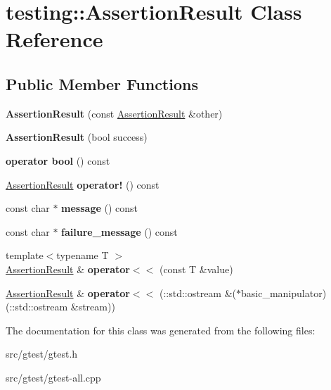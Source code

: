 \hypertarget{classtesting_1_1_assertion_result}{}\section{testing\+:\+:Assertion\+Result Class Reference}
\label{classtesting_1_1_assertion_result}
\subsection*{Public Member Functions}
\begin{DoxyCompactItemize}
\item 
\mbox{\label{classtesting_1_1_assertion_result_a27788116f03f90aec4daf592fd809ead}} 
{\bfseries Assertion\+Result} (const \mbox{\hyperlink{classtesting_1_1_assertion_result}{Assertion\+Result}} \&other)
\item 
\mbox{\label{classtesting_1_1_assertion_result_ade695178c05c4b2f82e92930c912fc25}} 
{\bfseries Assertion\+Result} (bool success)
\item 
\mbox{\label{classtesting_1_1_assertion_result_ab3f34b1623c82762ef4a8f52b535159c}} 
{\bfseries operator bool} () const
\item 
\mbox{\label{classtesting_1_1_assertion_result_a5b0784686a756660ac8dfe528d89386b}} 
\mbox{\hyperlink{classtesting_1_1_assertion_result}{Assertion\+Result}} {\bfseries operator!} () const
\item 
\mbox{\label{classtesting_1_1_assertion_result_a33c14dafd28e3393c841e03f4b70a017}} 
const char $\ast$ {\bfseries message} () const
\item 
\mbox{\label{classtesting_1_1_assertion_result_aa38908d5a48c912434a80c8725f52583}} 
const char $\ast$ {\bfseries failure\+\_\+message} () const
\item 
\mbox{\label{classtesting_1_1_assertion_result_a3230efa81aafe7c61f5fb878cfa39e91}} 
{\footnotesize template$<$typename T $>$ }\\\mbox{\hyperlink{classtesting_1_1_assertion_result}{Assertion\+Result}} \& {\bfseries operator$<$$<$} (const T \&value)
\item 
\mbox{\label{classtesting_1_1_assertion_result_a43ae8a260843ce2ff3dc9af262672b8b}} 
\mbox{\hyperlink{classtesting_1_1_assertion_result}{Assertion\+Result}} \& {\bfseries operator$<$$<$} (\+::std\+::ostream \&($\ast$basic\+\_\+manipulator)(\+::std\+::ostream \&stream))
\end{DoxyCompactItemize}


The documentation for this class was generated from the following files\+:\begin{DoxyCompactItemize}
\item 
src/gtest/gtest.\+h\item 
src/gtest/gtest-\/all.\+cpp\end{DoxyCompactItemize}
